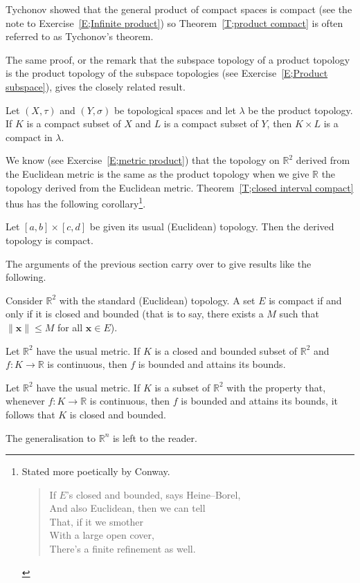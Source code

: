 Tychonov showed that
the general product of compact spaces
is compact (see the note to Exercise~\ref{E;Infinite product})
so Theorem~\ref{T;product compact} is often
referred to as Tychonov's theorem.

The same proof, or the remark that the subspace topology
of a product topology is the product topology of the subspace
topologies (see Exercise~\ref{E;Product subspace}),
gives the closely related result.
\begin{theorem}\label{T;product subspace compact}
Let $(X,\tau)$ and $(Y,\sigma)$ be topological spaces
and let $\lambda$ be the product topology.
If $K$ is a compact subset of $X$ and
$L$ is a compact subset of $Y$, then $K\times L$
is a compact in $\lambda$.
\end{theorem}
We know (see Exercise~\ref{E;metric product}) that the topology
on ${\mathbb R}^{2}$ derived from the Euclidean metric
is the same as the product topology when we
give ${\mathbb R}$ the topology derived from the Euclidean metric.
Theorem~\ref{T;closed interval compact} thus has the following 
corollary\footnote{Stated more poetically by Conway.
\begin{verse}
If $E$'s closed and bounded, says Heine--Borel,\\
And also Euclidean, then we can tell\\
That, if it we smother\\
With a large open cover,\\
There's a finite refinement as well.
\end{verse}
}.
\begin{theorem}
Let $[a,b]\times[c,d]$ be given its usual (Euclidean)
topology. Then the derived topology is compact.
\end{theorem}
The arguments of the previous section carry over to give
results like the following.
\begin{theorem}
Consider ${\mathbb R}^{2}$ with the standard 
(Euclidean) topology. A set $E$ is compact if and
only if it is closed and bounded
(that is to say, there exists a 
$M$ such that $\|{\mathbf x}\|\leq M$ for all ${\mathbf x}\in E$).
\end{theorem}
\begin{theorem}\label{T;compact Euclidean} 
Let ${\mathbb R}^{2}$ have the usual metric.
If $K$ is a
closed and bounded subset of ${\mathbb R}^{2}$
and $f:K\rightarrow{\mathbb R}$ is continuous,
then $f$ is bounded and attains its bounds.
\end{theorem}
\begin{exercise} 
Let ${\mathbb R}^{2}$ have the usual metric.
If $K$ is a subset of ${\mathbb R}^{2}$ with the property
that, whenever $f:K\rightarrow{\mathbb R}$ is continuous,
then $f$ is bounded and attains its bounds, it follows
that $K$ is closed and bounded.
\end{exercise}
The generalisation to ${\mathbb R}^{n}$ is left to the reader.

